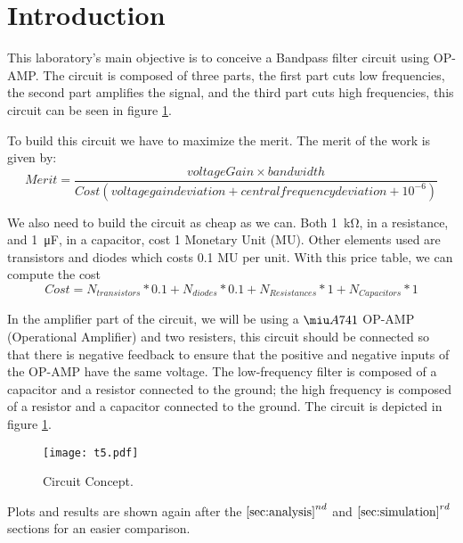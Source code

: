\section{Introduction}

This laboratory's main objective is to conceive a Bandpass filter circuit using OP-AMP. The circuit is composed of three parts, the first part cuts low frequencies, the second part amplifies the signal, and the third part cuts high frequencies, this circuit can be seen in figure \ref{Fig1: circuit}.

To build this circuit we have to maximize the merit. The merit of the work is given by:
\begin{equation}
    Merit = \dfrac{voltageGain \times bandwidth}{Cost (voltage gain deviation + central frequency deviation + 10^{-6})}
\end{equation}

We also need to build the circuit as cheap as we can. Both \SI{1}{\kilo\ohm}, in a resistance, and \SI{1}{\micro\farad}, in a capacitor, cost 1 Monetary Unit (MU). Other elements used are transistors and diodes which costs 0.1 MU per unit.
With this price table, we can compute the cost
\begin{equation}
    Cost = N_{transistors}*0.1+N_{diodes}*0.1+N_{Resistances}*1+N_{Capacitors}*1
\end{equation}

In the amplifier part of the circuit, we will be using a $\miu A741$ OP-AMP (Operational Amplifier) and two resisters, this circuit should be connected so that there is negative feedback to ensure that the positive and negative inputs of the OP-AMP have the same voltage. The low-frequency filter is composed of a capacitor and a resistor connected to the ground; the high frequency is composed of a resistor and a capacitor connected to the ground. The circuit is depicted in figure \ref{Fig1: circuit}.

\begin{figure}[h] 
\centering
\texttt{[image: t5.pdf]}
\caption{Circuit Concept.}
\label{Fig1: circuit}
\end{figure}

Plots and results are shown again after the $\ref{sec:analysis}^{nd}$ and $\ref{sec:simulation}^{rd}$ sections for an easier comparison.
